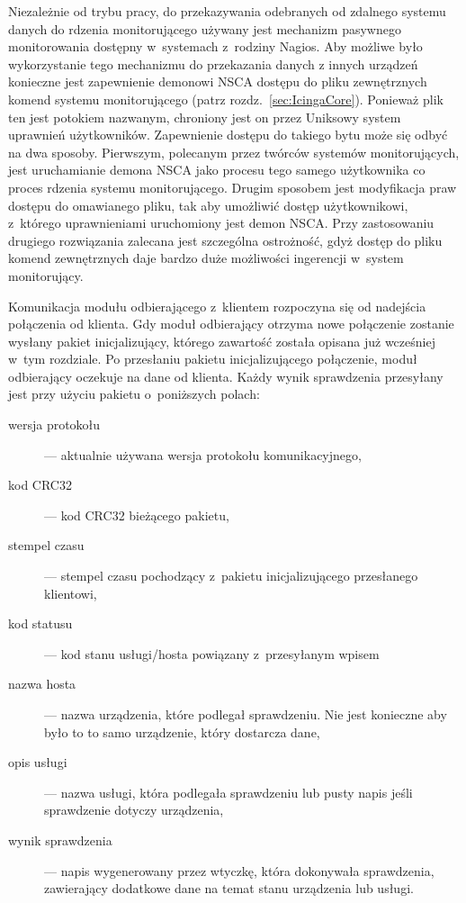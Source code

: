 Niezależnie od trybu pracy, do przekazywania odebranych od zdalnego
systemu danych do rdzenia monitorującego używany jest mechanizm
pasywnego monitorowania dostępny w~systemach z~rodziny Nagios. Aby
możliwe było wykorzystanie tego mechanizmu do przekazania danych z
innych urządzeń konieczne jest zapewnienie demonowi NSCA dostępu do
pliku zewnętrznych komend systemu monitorującego (patrz
rozdz.~\ref{sec:IcingaCore}). Ponieważ plik ten jest potokiem
nazwanym, chroniony jest on przez Uniksowy system uprawnień
użytkowników. Zapewnienie dostępu do takiego bytu może się odbyć na
dwa sposoby. Pierwszym, polecanym przez twórców systemów
monitorujących, jest uruchamianie demona NSCA jako procesu tego samego
użytkownika co proces rdzenia systemu monitorującego. Drugim sposobem
jest modyfikacja praw dostępu do omawianego pliku, tak aby umożliwić
dostęp użytkownikowi, z~którego uprawnieniami uruchomiony jest demon
NSCA. Przy zastosowaniu drugiego rozwiązania zalecana jest szczególna
ostrożność, gdyż dostęp do pliku komend zewnętrznych daje bardzo duże
możliwości ingerencji w~system monitorujący.

Komunikacja modułu odbierającego z~klientem rozpoczyna się od
nadejścia połączenia od klienta. Gdy moduł odbierający otrzyma nowe
połączenie zostanie wysłany pakiet inicjalizujący, którego zawartość
została opisana już wcześniej w~tym rozdziale. Po przesłaniu pakietu
inicjalizującego połączenie, moduł odbierający oczekuje na dane od
klienta. Każdy wynik sprawdzenia przesyłany jest przy użyciu pakietu
o~poniższych polach:

\begin{description}
\item[wersja protokołu] ---  aktualnie używana wersja protokołu komunikacyjnego,
\item[kod CRC32] ---  kod CRC32 bieżącego pakietu,
\item[stempel czasu] --- stempel czasu pochodzący z~pakietu
  inicjalizującego przesłanego klientowi,
\item[kod statusu] --- kod stanu usługi/hosta powiązany z~przesyłanym wpisem
\item[nazwa hosta] --- nazwa urządzenia, które podlegał sprawdzeniu. Nie jest
  konieczne aby było to to samo urządzenie, który dostarcza dane,
\item[opis usługi] --- nazwa usługi, która podlegała sprawdzeniu lub pusty
  napis jeśli sprawdzenie dotyczy urządzenia,
\item[wynik sprawdzenia] --- napis wygenerowany przez wtyczkę, która
  dokonywała sprawdzenia, zawierający dodatkowe dane na temat stanu
  urządzenia lub usługi.
\end{description}


